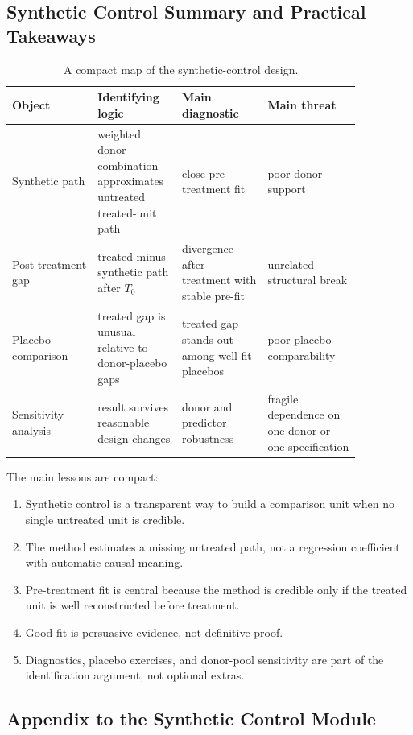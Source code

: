 \subsection{Synthetic Control Summary and Practical Takeaways}
\begin{table}[h]
\centering
\small
\begin{tabular}{p{0.22\linewidth}p{0.18\linewidth}p{0.22\linewidth}p{0.24\linewidth}}
\toprule
Object & Identifying logic & Main diagnostic & Main threat \\
\midrule
Synthetic path & weighted donor combination approximates untreated treated-unit path & close pre-treatment fit & poor donor support \\
Post-treatment gap & treated minus synthetic path after $T_0$ & divergence after treatment with stable pre-fit & unrelated structural break \\
Placebo comparison & treated gap is unusual relative to donor-placebo gaps & treated gap stands out among well-fit placebos & poor placebo comparability \\
Sensitivity analysis & result survives reasonable design changes & donor and predictor robustness & fragile dependence on one donor or one specification \\
\bottomrule
\end{tabular}
\caption{A compact map of the synthetic-control design.}
\label{tab:sc_summary}
\end{table}

The main lessons are compact:
\begin{enumerate}
\item Synthetic control is a transparent way to build a comparison unit when no single untreated unit is credible.
\item The method estimates a missing untreated path, not a regression coefficient with automatic causal meaning.
\item Pre-treatment fit is central because the method is credible only if the treated unit is well reconstructed before treatment.
\item Good fit is persuasive evidence, not definitive proof.
\item Diagnostics, placebo exercises, and donor-pool sensitivity are part of the identification argument, not optional extras.
\end{enumerate}

\subsection*{Appendix to the Synthetic Control Module}
\hypertarget{app:sc-geom}{}
